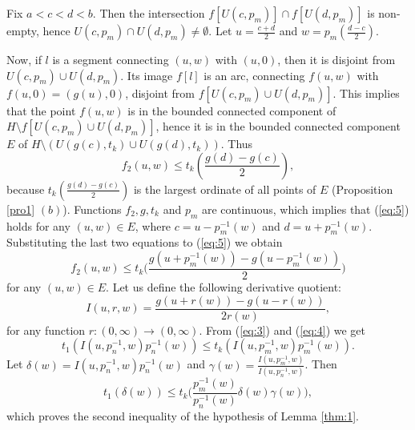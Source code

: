 \documentclass[a4paper,12pt,leqno]{amsart}
\theoremstyle{definition}
\renewcommand{\leq}{\leqslant}
\begin{document}
Fix $a<c<d<b$.
Then the intersection $f[U(c,p_m)]\cap f[U(d,p_m)]$ is non-empty, hence $U(c,p_m)\cap U(d,p_m)\neq\emptyset$.
Let $u=\frac{c+d}2$ and $w=p_m(\frac{d-c}2)$.  
      \def\t{-.4}
      \begin{center}
      \end{center}
Now, if  $l$ is a segment connecting  $(u,w)$ with $(u,0)$, then it is disjoint from  $U(c,p_m)\cup U(d,p_m)$.
     Its image $f[l]$ is an arc, connecting $f(u,w)$ with $f(u,0)=(g(u),0)$, disjoint from  $f[U(c,p_m)\cup U(d,p_m)]$.
     This implies that the point $f(u,w)$ is in the bounded connected component of  $H\setminus f[U(c,p_m)\cup U(d,p_m)]$, hence it is in the bounded connected component $E$ of  $H\setminus (U(g(c),t_k)\cup U(g(d),t_k))$.
Thus
\begin{equation}
  \label{eq:5}
  \textstyle f_2(u,w)\leq  t_k(\frac{g(d)-g(c)}2),
\end{equation}
because $t_k(\frac{g(d)-g(c)}2)$ is the largest ordinate of all points of $E$ (Proposition \ref{pro1} $(b)$).
      Functions $f_2,g,t_k$  and  $p_m$ are continuous, which implies that (\ref{eq:5}) holds for any  $(u,w)\in E$, where $c=u-p_m^{-1}(w)$ and $d=u+p^{-1}_m(w)$.
      Substituting the last two equations to (\ref{eq:5}) we obtain 
      \begin{equation}
        \label{eq:4}
        f_2(u,w)\leq t_k\bigg(\frac{g(u+p^{-1}_m(w))-g(u-p^{-1}_m(w))}2\bigg)
      \end{equation}
      for any $(u,w)\in E$.
Let us define the following derivative quotient:
$$I(u,r,w)=\frac{g(u+r(w))-g(u-r(w))}{2r(w)},$$
for any function $r\colon(0,\infty)\to(0,\infty)$.
       From (\ref{eq:3}) and (\ref{eq:4}) we get
      $$\textstyle t_1(I(u,p_n^{-1},w)p_n^{-1}(w))\leq t_k(I(u,p_m^{-1},w)p_m^{-1}(w)).$$
Let $\delta(w)=I(u,p_n^{-1},w)p_n^{-1}(w)$ and $\gamma(w)=\frac{I(u,p_m^{-1},w)}{I(u,p_n^{-1},w)}$.
      Then
      $$ t_1(\delta(w))\leq t_k\bigg(\frac{p_m^{-1}(w)}{p_n^{-1}(w)}\delta(w)\gamma(w)\bigg),$$
     which proves the second inequality of the hypothesis of Lemma \ref{thm:1}.
\end{document}
